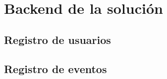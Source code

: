\section{Backend de la solución}

\subsection{Registro de usuarios}
\subsection{Registro de eventos}
